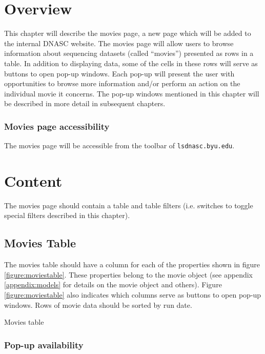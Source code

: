 
\section{Overview}

This chapter will describe the movies page, a new page which will be added to the internal 
DNASC website. The movies page will allow users to browse information about sequencing datasets 
(called ``movies'') presented as rows in a table. In addition to displaying data, some of the 
cells in these rows will serve as buttons to open pop-up windows. Each pop-up will present 
the user with opportunities to browse more information and/or perform an action on the 
individual movie it concerns. The pop-up windows mentioned in this chapter will be described 
in more detail in subsequent chapters. 

\subsubsection{Movies page accessibility}

The movies page will be accessible from the toolbar of \texttt{lsdnasc.byu.edu}.

\section{Content}

The movies page should contain a table and table filters (i.e. switches to toggle special 
filters described in this chapter).

\subsection{Movies Table}

The movies table should have a column for each of the properties shown in figure 
\ref{figure:moviestable}. These properties belong to the movie object (see appendix 
\ref{appendix:models} for details on the movie object and others). Figure 
\ref{figure:moviestable} also indicates which columns serve as buttons to open pop-up 
windows. Rows of movie data should be sorted by run date.

\begin{table}[h]
    
    \caption{Movies table}
    \label{figure:moviestable}
\end{table}

\subsubsection{Pop-up availability}

